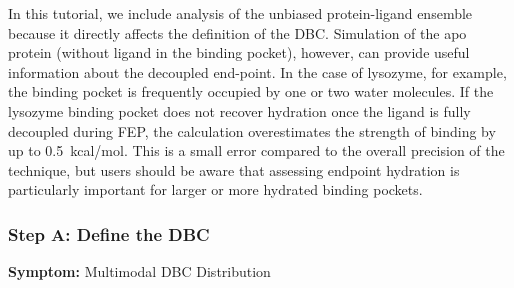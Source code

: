\documentclass[9pt,tutorial]{Styling/livecoms}
\begin{document}
In this tutorial, we include analysis of the unbiased protein-ligand ensemble because it directly affects the definition of the DBC.
Simulation of the apo protein (without ligand in the binding pocket), however, can provide useful information about the decoupled end-point.
In the case of lysozyme, for example, the binding pocket is frequently occupied by one or two water molecules. 
If the lysozyme binding pocket does not recover hydration once the ligand is fully decoupled during FEP, the calculation overestimates the strength of binding by up to 0.5~kcal/mol. This is a small error compared to the overall precision of the technique, but users should be aware that assessing endpoint hydration is particularly important for larger or more hydrated binding pockets. 

\subsubsection{Step A: Define the DBC}
\noindent\textbf{Symptom:}  Multimodal DBC Distribution
\end{document}
